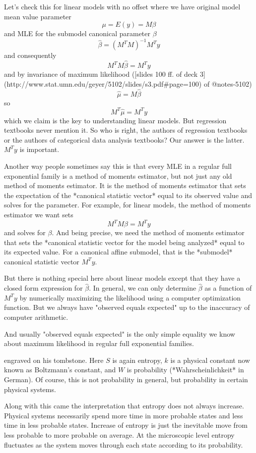 \documentclass[11pt]{article}
\begin{document}
Let's check this for linear models with no offset where we have
original model mean value parameter
$$
   \mu = E(y) = M \beta
$$
and MLE for the submodel canonical parameter $\beta$
$$
   \hat{\beta} = (M^T M)^{- 1} M^T y
$$
and consequently
$$
   M^T M \hat{\beta} = M^T y
$$
and by invariance of maximum likelihood ([slides 100 ff. of
deck 3](http://www.stat.umn.edu/geyer/5102/slides/s3.pdf#page=100)
of @notes-5102)
$$
   \hat{\mu} = M \hat{\beta}
$$
so
$$
   M^T \hat{\mu} = M^T y
$$
which we claim is the key to understanding linear models.
But regression textbooks never mention it.
So who is right, the authors of regression textbooks or the authors of
categorical data analysis textbooks?  Our answer is the latter.
$M^T y$ is important.

Another way people sometimes say this is that every MLE in a regular full
exponential family is a method of moments estimator, but not just any old
method of moments estimator.  It is the method of moments estimator that
sets the expectation of the *canonical statistic vector* equal to its
observed value and solves for the parameter.  For example, for linear models,
the method of moments estimator we want sets
$$
   M^T M \beta = M^T y
$$
and solves for $\beta$.
And being precise, we need the method of moments estimator that sets the
*canonical statistic vector for the model being analyzed* equal to its
expected value.  For a canonical affine submodel, that is the *submodel*
canonical statistic vector $M^T y$.

But there is nothing special here about linear models except that they
have a closed form expression for $\hat{\beta}$.
In general, we can only determine $\hat{\beta}$ as a function of $M^T y$
by numerically maximizing the likelihood using a computer optimization
function.  But we always have "observed equals expected" up to the inaccuracy
of computer arithmetic.

And usually "observed equals expected" is the only simple equality
we know about maximum likelihood in regular full exponential families.

engraved on his tombstone.  Here $S$ is again entropy, $k$ is a physical
constant now known as Boltzmann's constant, and $W$ is probability
(*Wahrscheinlichkeit* in German).  Of course, this is not probability
in general, but probability in certain physical systems.

Along with this came the interpretation that entropy does not always increase.
Physical systems necessarily spend more time in more probable states and
less time in less probable states.  Increase of entropy is just the inevitable
move from less probable to more probable on average.  At the microscopic level
entropy fluctuates as the system moves through each state according to its
probability.
\end{document}
